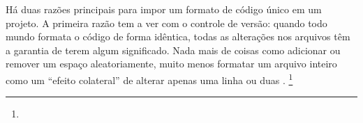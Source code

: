 \begin{citacao}
    Há duas razões principais para impor um formato de código único em um projeto.
    A primeira razão tem a ver com o controle de versão:
    quando todo mundo formata o código de forma idêntica,
    todas as alterações nos arquivos têm a garantia de terem algum significado.
    Nada mais de coisas como adicionar ou remover um espaço aleatoriamente,
    muito menos formatar um arquivo inteiro como um ``efeito colateral'' de
    alterar apenas uma linha ou duas \cite[tradução nossa]{Geukens}.
    \footnote{}
\end{citacao}

